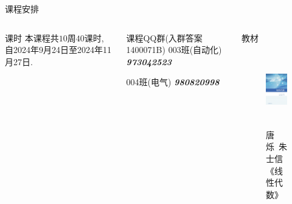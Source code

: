\begin{frame}{课程安排}
	\onslide<+->
	\begin{columns}
			\onslide<+->
			\begin{block*}{课时}
				本课程共$10$周$40$课时, 自2024年9月24日至2024年11月27日.
			\end{block*}
			\vspace{.4\baselineskip}
			\onslide<+->
			\begin{block}{课程QQ群(入群答案 1400071B)}
				\vspace{\baselineskip}
					003班(自动化) \emph{\textbf{973042523}}
					\vspace{\baselineskip}
					
					004班(电气) \emph{\textbf{980820998}}
			\end{block}
			\begin{block}{教材}
				\begin{figure}
					\includegraphics[height=32mm]{../image/book.jpg}
					\caption{唐烁\ 朱士信《线性代数》}
				\end{figure}
			\end{block}
		\end{columns}
\end{frame}



